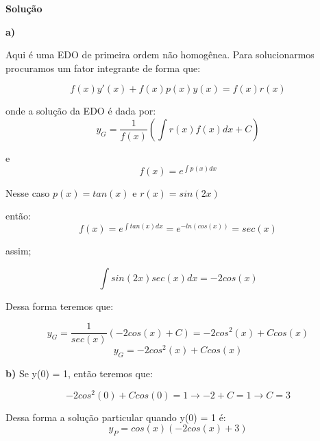\linespread{1.5}

\textbf{Solução}

\textbf{a)}

Aqui é uma EDO de primeira ordem não homogênea. Para solucionarmos procuramos um fator integrante de forma que:

\begin{equation*}
    f(x)y'(x) + f(x)p(x)y(x) = f(x)r(x) 
\end{equation*}

onde a solução da EDO é dada por:
\begin{equation*}
    y_G = \frac{1}{f(x)}\left(\int r(x)f(x) dx + C \right)
\end{equation*}

e \begin{equation*}
    f(x) = e^{\int p(x) dx}
\end{equation*}

Nesse caso $p(x) = tan(x)$ e $r(x) = sin(2x)$

então:
\begin{equation*}
    f(x) = e^{\int tan(x) dx} = e^{-ln(cos(x))} = sec(x)
\end{equation*}

assim;

\begin{equation*}
    \int sin(2x)sec(x) dx = -2cos(x)
\end{equation*}

Dessa forma teremos que:

\begin{equation*}
    y_G = \frac{1}{sec(x)}(-2cos(x) + C) = -2cos^2(x) + Ccos(x)
\end{equation*}
\begin{equation*}
    \boxed{y_G = -2cos^2(x) + Ccos(x)}
\end{equation*}

\textbf{b)} Se y(0) = 1, então teremos que:

\begin{equation*}
    -2cos^2(0) + Ccos(0) = 1 \rightarrow -2 + C = 1 \rightarrow C = 3
\end{equation*}

Dessa forma a solução particular quando y(0) = 1 é:
\begin{equation*}
    \boxed{y_P = cos(x)(-2cos(x) + 3)}
\end{equation*}
